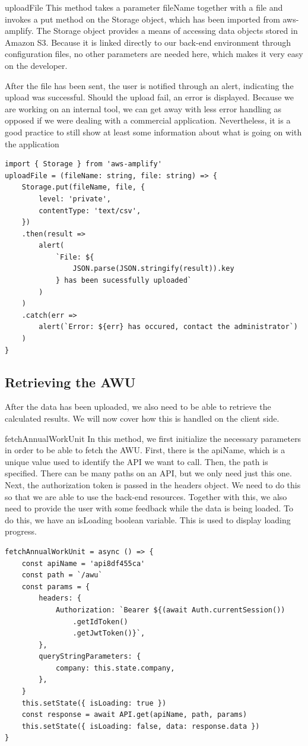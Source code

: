 \documentclass[12pt,oneside]{fithesis2}
\begin{document}
uploadFile This method takes a parameter fileName together with a file and invokes a put method on the Storage object, which has been imported from aws-amplify. The Storage object provides a means of accessing data objects stored in Amazon S3. Because it is linked directly to our back-end environment through configuration files, no other parameters are needed here, which makes it very easy on the developer.

After the file has been sent, the user is notified through an alert, indicating the upload was successful. Should the upload fail, an error is displayed. Because we are working on an internal tool, we can get away with less error handling as opposed if we were dealing with a commercial application. Nevertheless, it is a good practice to still show at least some information about what is going on with the application
\begin{lstlisting}[style=htmlcssjs]
import { Storage } from 'aws-amplify'
uploadFile = (fileName: string, file: string) => {
	Storage.put(fileName, file, {
		level: 'private',
		contentType: 'text/csv',
    })
	.then(result =>
		alert(
			`File: ${
				JSON.parse(JSON.stringify(result)).key
			} has been sucessfully uploaded`
		)
	)
	.catch(err =>
		alert(`Error: ${err} has occured, contact the administrator`)
	)
}
\end{lstlisting}

\subsection{Retrieving the AWU}
After the data has been uploaded, we also need to be able to retrieve the calculated results. We will now cover how this is handled on the client side.

fetchAnnualWorkUnit In this method, we first initialize the necessary parameters in order to be able to fetch the AWU. First, there is the apiName, which is a unique value used to identify the API we want to call. Then, the path is specified. There can be many paths on an API, but we only need just this one. Next, the authorization token is passed in the headers object. We need to do this so that we are able to use the back-end resources. Together with this, we also need to provide the user with some feedback while the data is being loaded. To do this, we have an isLoading boolean variable. This is used to display loading progress.

\begin{lstlisting}[style=htmlcssjs]
fetchAnnualWorkUnit = async () => {
	const apiName = 'api8df455ca'
	const path = `/awu`
	const params = {
		headers: {
			Authorization: `Bearer ${(await Auth.currentSession())
				.getIdToken()
				.getJwtToken()}`,
		},
		queryStringParameters: {
			company: this.state.company,
		},
	}
	this.setState({ isLoading: true })
	const response = await API.get(apiName, path, params)
	this.setState({ isLoading: false, data: response.data })
}
\end{lstlisting}
\end{document}
